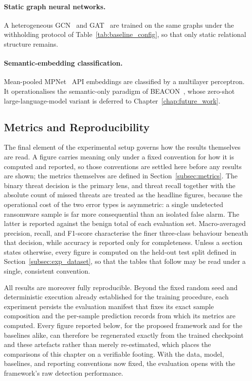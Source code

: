 \documentclass[%
    BCOR=10mm,
    DIV=13,
    toc=bibliography,
    toc=listof,
    oneside,
    12pt,
]{scrbook}
\begin{document}
\paragraph{Static graph neural networks.} A heterogeneous
GCN~\cite{kipf2017gcn} and GAT~\cite{velickovic2018gat} are trained on the same
graphs under the withholding protocol of Table~\ref{tab:baseline_config}, so
that only static relational structure remains.

\paragraph{Semantic-embedding classification.} Mean-pooled
MPNet~\cite{mpnet2020} API embeddings are classified by a multilayer
perceptron. It operationalises the semantic-only paradigm of
BEACON~\cite{perera2023beacon}, whose zero-shot large-language-model variant
is deferred to Chapter~\ref{chap:future_work}.


\subsection{Metrics and Reproducibility}
\label{subsec:exp_metrics}

The final element of the experimental setup governs how the results themselves are
read. A figure carries meaning only under a fixed convention for how it is computed
and reported, so those conventions are settled here before any results are shown;
the metrics themselves are defined in Section~\ref{subsec:metrics}. The binary
threat decision is the primary lens, and threat recall together with the absolute count of missed
threats are treated as the headline figures, because the operational cost of the
two error types is asymmetric: a single undetected ransomware sample is far more
consequential than an isolated false alarm. The latter is reported against the
benign total of each evaluation set. Macro-averaged precision,
recall, and F1-score characterise the finer three-class behaviour beneath that
decision,
while accuracy is reported only for completeness. Unless a section states otherwise, every figure is computed
on the held-out test split defined in Section~\ref{subsec:exp_dataset}, so that
the tables that follow may be read under a single, consistent convention.

All results are moreover fully reproducible. Beyond the fixed random seed and
deterministic execution already established for the training procedure, each
experiment persists the evaluation manifest that fixes its exact sample
composition and the per-sample prediction records from which its metrics are
computed. Every figure reported below, for the proposed framework and for the
baselines alike, can therefore be regenerated exactly from the trained checkpoint
and these artefacts rather than merely re-estimated, which places the comparisons
of this chapter on a verifiable footing. With the data, model, baselines, and
reporting conventions now fixed, the evaluation opens with the framework's raw
detection performance.
\end{document}
